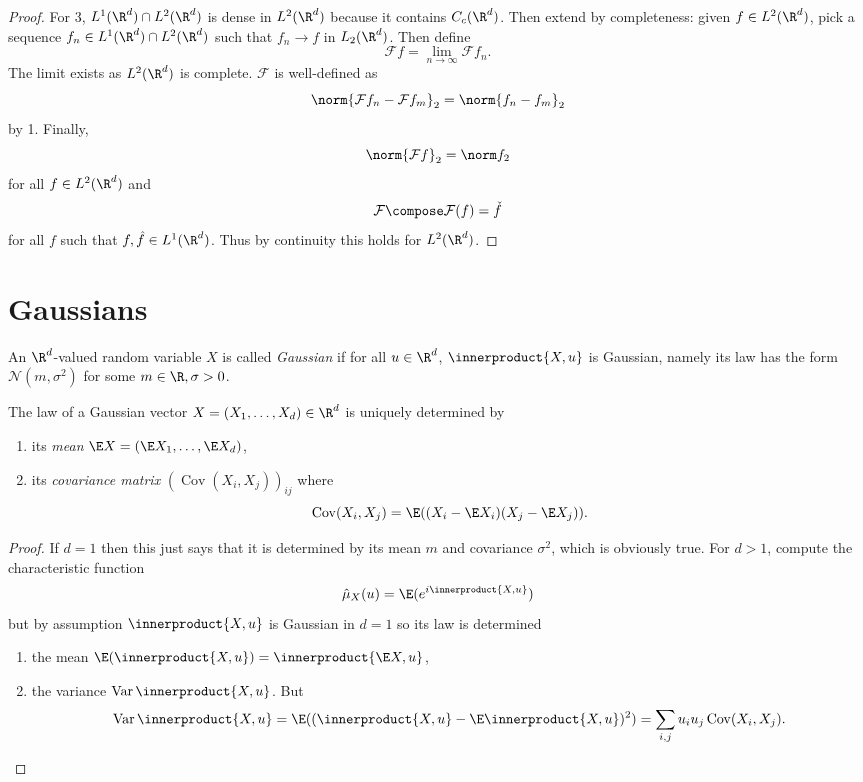 \documentclass[a4paper]{article}
\DeclareMathOperator{\var}{Var} %
\newcommand*{\ip}{\innerproduct} %
\DeclareMathOperator{\cov}{Cov} %
\begin{document}
\begin{proof}
  For 3, \(L^1(\R^d) \cap L^2(\R^d)\) is dense in \(L^2(\R^d)\) because it contains \(C_c(\R^d)\). Then extend by completeness: given \(f \in L^2(\R^d)\), pick a sequence \(f_n \in L^1(\R^d) \cap L^2(\R^d)\) such that \(f_n \to f\) in \(L_2(\R^d)\). Then define
  \[
    \mathcal F f = \lim_{n \to \infty} \mathcal F f_n.
  \]
  The limit exists as \(L^2(\R^d)\) is complete. \(\mathcal F\) is well-defined as
  \[
    \norm{\mathcal F f_n - \mathcal F f_m}_2 = \norm{f_n - f_m}_2
  \]
  by 1. Finally,
  \[
    \norm{\mathcal F f}_2 = \norm f_2
  \]
  for all \(f \in L^2(\R^d)\) and
  \[
    \mathcal F \compose \mathcal F(f) = \check f
  \]
  for all \(f\) such that \(f, \hat f \in L^1(\R^d)\). Thus by continuity this holds for \(L^2(\R^d)\).
\end{proof}

\section{Gaussians}

\begin{definition}[Gaussian]
  An \(\R^d\)-valued random variable \(X\) is called \emph{Gaussian} if for all \(u \in \R^d\), \(\ip{X, u}\) is Gaussian, namely its law has the form \(\mathcal N(m, \sigma^2)\) for some \(m \in \R, \sigma > 0\).
\end{definition}

\begin{proposition}
  The law of a Gaussian vector \(X = (X_1, \dots, X_d) \in \R^d\) is uniquely determined by
  \begin{enumerate}
  \item its \emph{mean} \(\E X = (\E X_1, \dots, \E X_d)\),
  \item its \emph{covariance matrix} \((\cov(X_i, X_j))_{ij}\) where
    \[
      \cov(X_i, X_j) = \E((X_i - \E X_i) (X_j - \E X_j)).
    \]
  \end{enumerate}
\end{proposition}

\begin{proof}
  If \(d = 1\) then this just says that it is determined by its mean \(m\) and covariance \(\sigma^2\), which is obviously true. For \(d > 1\), compute the characteristic function
  \[
    \hat \mu_X(u) = \E(e^{i \ip{X, u}})
  \]
  but by assumption \(\ip{X, u}\) is Gaussian in \(d = 1\) so its law is determined
  \begin{enumerate}
  \item the mean \(\E(\ip{X, u}) = \ip{\E X, u}\),
  \item the variance \(\var \ip{X, u}\). But
    \[
      \var \ip{X, u}
      = \E((\ip{X, u} - \E \ip{X, u})^2)
      = \sum_{i, j} u_iu_j \cov (X_i, X_j).
    \]
  \end{enumerate}

\end{proof}











\printindex
\end{document}
